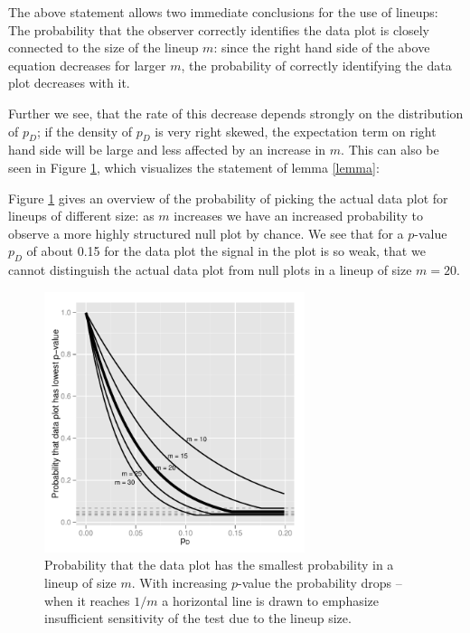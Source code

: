 \documentclass{article}
\newcommand{\blue}[1]{{\color{blue} #1}} %
\begin{document}
\blue{
The above statement allows two immediate conclusions for the use of lineups:
The probability that the observer correctly identifies the data plot is closely connected to the size of the lineup $m$: since the right hand side of the above equation decreases for larger $m$, the probability of correctly identifying the data plot decreases with it. 

Further we see, that the rate of this decrease depends strongly on the distribution of $p_D$; 
if the density of $p_D$ is very right skewed, the  expectation term on right hand side will be large and  less affected by an increase in $m$. This can also be seen in Figure \ref{fig:pval_power}, which 
visualizes the statement of lemma \ref{lemma}: }  Figure \ref{fig:pval_power} gives an overview of the probability of picking the actual data plot for lineups of different size: as $m$ increases we have an increased probability to observe a more highly structured null plot by chance. We see that for a $p$-value $p_D$ of about 0.15 for the data plot the signal in the plot is so weak, that we cannot distinguish the actual data plot from null plots in a lineup of size $m=20$. %




\begin{figure}[htbp] %
   \centering
   \includegraphics[width=3in]{images/powerplot.pdf} 
   \caption{Probability that the data plot has the smallest probability in a lineup of size $m$. With increasing $p$-value the probability drops -- when it reaches $1/m$ a horizontal line is drawn to emphasize insufficient sensitivity of the test due to the lineup size. 
}
   \label{fig:pval_power}
\end{figure}
\end{document}
